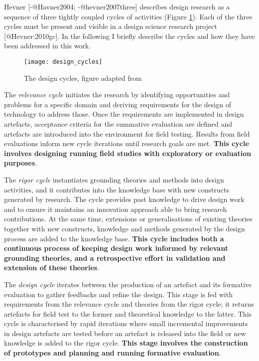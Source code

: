 Hevner {[}-@Havner2004; -@hevner2007three{]} describes design research
as a sequence of three tightly coupled cycles of activities (Figure
\ref{fig:design-cycles}). Each of the three cycles must be present and
visible in a design science research project {[}@Hevner:2010gc{]}. In
the following I briefly describe the cycles and how they have been
addressed in this work.

\begin{figure}[tbh]
    \centering
    \texttt{[image: design\_cycles]}
    \caption{The design cycles, figure adapted from \protect\cite{hevner2007three}}
    \label{fig:design-cycles}
\end{figure}

The \emph{relevance cycle} initiates the research by identifying
opportunities and problems for a specific domain and deriving
requirements for the design of technology to address those. Once the
requirements are implemented in design artefacts, acceptance criteria
for the summative evaluation are defined and artefacts are introduced
into the environment for field testing. Results from field evaluations
inform new cycle iterations until research goals are met. \textbf{This
cycle involves designing running field studies with exploratory or
evaluation purposes}.

The \emph{rigor cycle} instantiates grounding theories and methods into
design activities, and it contributes into the knowledge base with new
constructs generated by research. The cycle provides past knowledge to
drive design work and to ensure it maintains an innovation approach able
to bring research contributions. At the same time, extensions or
generalisations of existing theories together with new constructs,
knowledge and methods generated by the design process are added to the
knowledge base. \textbf{This cycle includes both a continuous process of
keeping design work informed by relevant grounding theories, and a
retrospective effort in validation and extension of these theories}.

The \emph{design cycle} iterates between the production of an artefact
and its formative evaluation to gather feedbacks and refine the design.
This stage is fed with requirements from the relevance cycle and
theories from the rigor cycle; it returns artefacts for field test to
the former and theoretical knowledge to the latter. This cycle is
characterised by rapid iterations where small incremental improvements
in design artefacts are tested before an artefact is released into the
field or new knowledge is added to the rigor cycle. \textbf{This stage
involves the construction of prototypes and planning and running
formative evaluation}.

